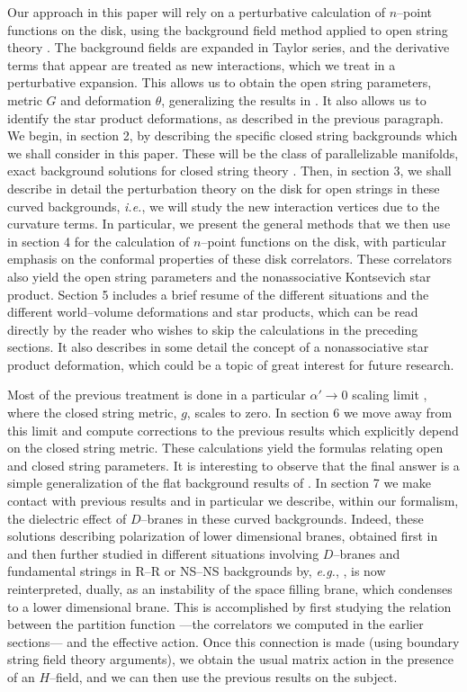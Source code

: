 \documentclass[a4paper,11pt]{article}
\begin{document}
Our approach in this paper will rely on a perturbative calculation of
$n$--point functions on the disk, using the background field method applied
to open string theory \cite{AFM, Fradkin-Tseytlin, ACNY, CLNY}. The
background fields are expanded in Taylor series, and the derivative terms
that appear are treated as new interactions, which we treat in a
perturbative expansion. This allows us to obtain the open string
parameters, metric $G$ and deformation $\theta$, generalizing the results
in \cite{CLNY, Schomerus, Seiberg-Witten}. It also allows us to identify
the star product deformations, as described in the previous paragraph. We
begin, in section 2, by describing the specific closed string backgrounds
which we shall consider in this paper. These will be the class of
parallelizable manifolds, exact background solutions for closed string
theory \cite{BCZ}. Then, in section 3, we shall describe in detail the
perturbation theory on the disk for open strings in these curved
backgrounds, \textit{i.e.}, we will study the new interaction vertices due
to the curvature terms. In particular, we present the general methods that
we then use in section 4 for the calculation of $n$--point functions on the
disk, with particular emphasis on the conformal properties of these disk
correlators. These correlators also yield the open string parameters and
the nonassociative Kontsevich star product. Section 5 includes a brief
resume of the different situations and the different world--volume
deformations and star products, which can be read directly by the reader
who wishes to skip the calculations in the preceding sections.  It also
describes in some detail the concept of a nonassociative star product
deformation, which could be a topic of great interest for future research.

Most of the previous treatment is done in a particular $\alpha' \to 0$
scaling limit \cite{Seiberg-Witten}, where the closed string metric, $g$,
scales to zero. In section 6 we move away from this limit and compute
corrections to the previous results which explicitly depend on the closed
string metric. These calculations yield the formulas relating open and
closed string parameters. It is interesting to observe that the final
answer is a simple generalization of the flat background results of
\cite{CLNY, Schomerus, Seiberg-Witten}. In section 7 we make contact with
previous results and in particular we describe, within our formalism, the
dielectric effect of $D$--branes \cite{Myers} in these curved backgrounds.
Indeed, these solutions describing polarization of lower dimensional
branes, obtained first in \cite{Myers} and then further studied in
different situations involving $D$--branes and fundamental strings in R--R
or NS--NS backgrounds by, \textit{e.g.}, \cite{CMT, Schiappa, MTR, JMR,
DTV, Kluson, Lozano}, is now reinterpreted, dually, as an instability of
the space filling brane, which condenses to a lower dimensional brane.
This is accomplished by first studying the relation between the partition
function ---the correlators we computed in the earlier sections--- and the
effective action. Once this connection is made (using boundary string field
theory arguments), we obtain the usual matrix action in the presence of an
$H$--field, and we can then use the previous results on the subject.
\end{document}
